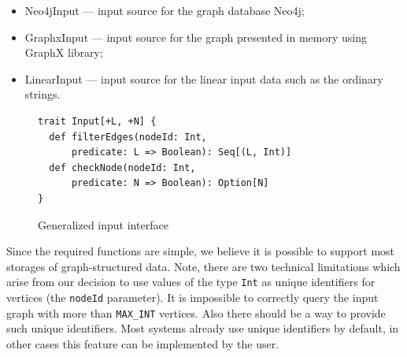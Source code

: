 
\begin{itemize}
    \item Neo4jInput --- input source for the graph database Neo4j;
    \item GraphxInput --- input source for the graph presented in memory using GraphX library;
    \item LinearInput --- input source for the linear input data such as the ordinary strings.
\end{itemize}

\begin{figure}[h]
\begin{lstlisting}
trait Input[+L, +N] {
  def filterEdges(nodeId: Int, 
      predicate: L => Boolean): Seq[(L, Int)]
  def checkNode(nodeId: Int, 
      predicate: N => Boolean): Option[N]
}

\end{lstlisting}
\caption{Generalized input interface}
\label{fig:input}
\end{figure}

Since the required functions are simple, we believe it is possible to support most storages of graph-structured data.
Note, there are two technical limitations which arise from our decision to use values of the type \lstinline{Int} as unique identifiers for vertices (the \lstinline{nodeId} parameter).
It is impossible to correctly query the input graph with more than \lstinline{MAX_INT} vertices. 
Also there should be a way to provide such unique identifiers. Most systems already use unique identifiers by default, in other cases this feature can be implemented by the user.




